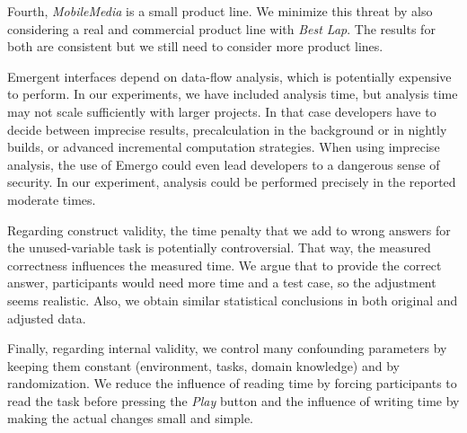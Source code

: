 
Fourth, \textit{MobileMedia} is a small product line. We minimize this threat by also considering a real and commercial product line with \textit{Best Lap}. The results for both are consistent but we still need to consider more product lines. %

Emergent interfaces depend on data-flow analysis, which is potentially expensive to perform. In our experiments, we have included analysis time, but analysis time may not scale sufficiently with larger projects. In that case developers have to decide between imprecise results, precalculation in the background or in nightly builds, or advanced incremental computation strategies. When using imprecise analysis, the use of Emergo could even lead developers to a dangerous sense of security. In our experiment, analysis could be performed precisely in the reported moderate times.

Regarding construct validity, the time penalty that we add to wrong answers for the unused-variable task is potentially controversial. That way, the measured correctness influences the measured time. We argue that to provide the correct answer, participants would need more time and a test case, so the adjustment seems realistic. Also, we obtain similar statistical conclusions in both original and adjusted data.


Finally, regarding internal validity, we control many confounding parameters by keeping them constant (environment, tasks, domain knowledge) and by randomization. We reduce the influence of reading time by forcing participants to read the task before pressing the \textit{Play} button and the influence of writing time by making the actual changes small and simple. 

